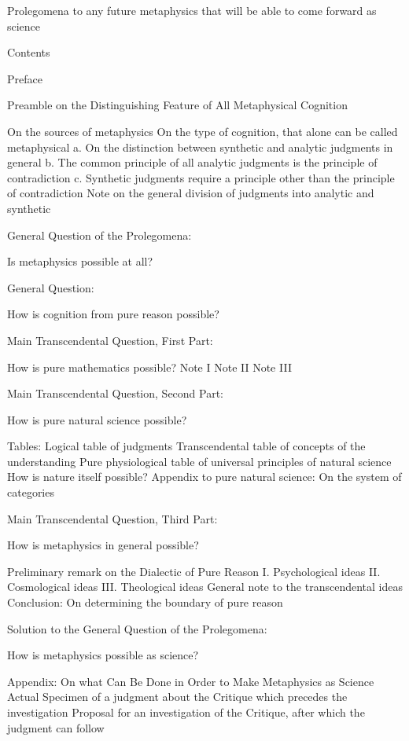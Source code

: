 Prolegomena to any future metaphysics
that will be able to come forward as science

Contents

Preface

Preamble on the Distinguishing Feature of All Metaphysical Cognition

    On the sources of metaphysics
    On the type of cognition,
    that alone can be called metaphysical
        a. On the distinction between
        synthetic and analytic judgments in general
        b. The common principle of all analytic judgments is
        the principle of contradiction
        c. Synthetic judgments require a principle other than
        the principle of contradiction
    Note on the general division of judgments
    into analytic and synthetic

General Question of the Prolegomena:

    Is metaphysics possible at all?

General Question:

    How is cognition from pure reason possible?

Main Transcendental Question, First Part:

    How is pure mathematics possible?
    Note I
    Note II
    Note III

Main Transcendental Question, Second Part:

    How is pure natural science possible?

    Tables: Logical table of judgments
        Transcendental table of
        concepts of the understanding
        Pure physiological table of
        universal principles of natural science
    How is nature itself possible?
    Appendix to pure natural science: On the system of categories

Main Transcendental Question, Third Part:

    How is metaphysics in general possible?

    Preliminary remark on the Dialectic of Pure Reason
    I. Psychological ideas
    II. Cosmological ideas
    III. Theological ideas
    General note to the transcendental ideas
    Conclusion: On determining the boundary of pure reason

Solution to the General Question of the Prolegomena:

    How is metaphysics possible as science?

Appendix: On what Can Be Done in Order to Make
Metaphysics as Science Actual
    Specimen of a judgment about the Critique
    which precedes the investigation
    Proposal for an investigation of the Critique,
    after which the judgment can follow

